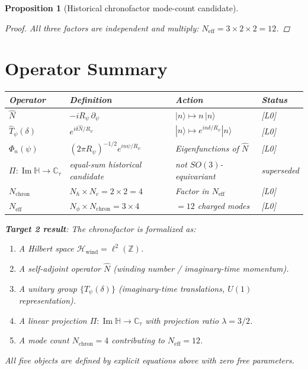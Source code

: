 \documentclass[12pt,a4paper]{article}
\newtheorem{proposition}[theorem]{Proposition}
\theoremstyle{definition}
\theoremstyle{remark}
\begin{document}
\begin{proposition}[Historical chronofactor mode-count candidate]
\begin{proof}
All three factors are independent and multiply: $N_{\mathrm{eff}} = 3 \times 2 \times 2 = 12$.
\end{proof}

\section{Operator Summary}
\label{sec:chron:summary}

\begin{center}
\renewcommand{\arraystretch}{1.4}
\begin{tabular}{llll}
\toprule
Operator & Definition & Action & Status \\
\midrule
$\hat{N}$ & $-iR_\psi\,\partial_\psi$ & $|n\rangle \mapsto n\,|n\rangle$ & [L0] \\
$\hat{T}_\psi(\delta)$ & $e^{i\delta\hat{N}/R_\psi}$ & $|n\rangle \mapsto e^{in\delta/R_\psi}|n\rangle$ & [L0] \\
$\Phi_n(\psi)$ & $(2\pi R_\psi)^{-1/2}e^{in\psi/R_\psi}$ & Eigenfunctions of $\hat{N}$ & [L0] \\
$\Pi: \operatorname{Im}\mathbb{H}\to\mathbb{C}_\tau$ & equal-sum historical candidate & not $SO(3)$-equivariant & superseded \\
$N_{\mathrm{chron}}$ & $N_h\times N_c = 2\times 2 = 4$ & Factor in $N_{\mathrm{eff}}$ & [L0] \\
$N_{\mathrm{eff}}$ & $N_\phi\times N_{\mathrm{chron}} = 3\times 4$ & $= 12$ charged modes & [L0] \\
\bottomrule
\end{tabular}
\end{center}

\begin{resultbox}
\textbf{Target 2 result}: The chronofactor is formalized as:
\begin{enumerate}
  \item A \emph{Hilbert space} $\mathcal{H}_{\mathrm{wind}} = \ell^2(\mathbb{Z})$.
  \item A \emph{self-adjoint operator} $\hat{N}$ (winding number / imaginary-time momentum).
  \item A \emph{unitary group} $\{\hat{T}_\psi(\delta)\}$ (imaginary-time translations, $U(1)$ representation).
  \item A \emph{linear projection} $\Pi: \operatorname{Im}\mathbb{H} \to \mathbb{C}_\tau$
        with projection ratio $\lambda = 3/2$.
  \item A \emph{mode count} $N_{\mathrm{chron}} = 4$ contributing to $N_{\mathrm{eff}} = 12$.
\end{enumerate}
All five objects are defined by explicit equations above with zero free parameters.
\end{resultbox}


\end{proposition}
\end{document}
